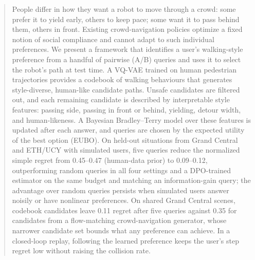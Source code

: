 \begin{abstract}
People differ in how they want a robot to move through a crowd: some prefer it to yield early, others to keep pace;
some want it to pass behind them, others in front. Existing crowd-navigation policies optimize a fixed notion of social
compliance and cannot adapt to such individual preferences. We present a framework that identifies a user's walking-style
preference from a handful of pairwise (A/B) queries and uses it to select the robot's path at test time. A VQ-VAE trained on
human pedestrian trajectories provides a codebook of walking behaviours that generates style-diverse, human-like candidate paths.
Unsafe candidates are filtered out, and each remaining candidate is described by interpretable style features: passing side,
passing in front or behind, yielding, detour width, and human-likeness. A Bayesian Bradley--Terry model over these features is
updated after each answer, and queries are chosen by the expected utility of the best option (EUBO). On held-out situations from
Grand Central and ETH/UCY with simulated users, five queries reduce the normalized simple regret from 0.45--0.47 (human-data prior)
to 0.09--0.12, outperforming random queries in all four settings and a DPO-trained estimator on the same budget and matching an
information-gain query; the advantage over random queries persists when simulated users answer noisily or have nonlinear preferences. On shared
Grand Central scenes, codebook candidates leave 0.11 regret after five queries against 0.35 for candidates from a flow-matching
crowd-navigation generator, whose narrower candidate set bounds what any preference can achieve. In a closed-loop replay,
following the learned preference keeps the user's step regret low without raising the collision rate.
\end{abstract}
